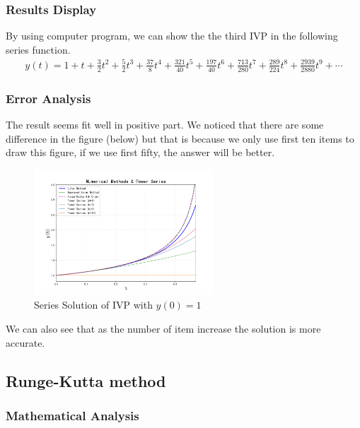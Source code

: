 \documentclass{article}
\begin{document}
\subsubsection{Results Display}

By using computer program, we can show the the third IVP in the following series function.
\begin{align*}
    y(t) = 1 + t + \frac{3}{2} t^2 + \frac{5}{2}t^3 + \frac{37}{8} t^4 + \frac{321}{40}t^5 + \frac{197}{40} t^6 + \frac{713}{280} t^7 + \frac{289}{224} t^8 + \frac{2939}{2880}t^9 + \cdots
\end{align*}

\subsubsection{Error Analysis}
The result seems fit well in positive part. We noticed that there are some difference in the figure (below) but that is because we only use first ten items to draw this figure, if we use first fifty, the answer will be better.
    
    \begin{figure}[htbp]
    \centering
        \centering
        \includegraphics[width=0.6\textwidth]{pic/series.png }
        \caption{Series Solution of IVP with $y(0)=1$}
        \label{fig:Picard_-1}
    \end{figure}

We can also see that as the number of item increase the solution is more accurate.
\subsection{Runge-Kutta method}




\subsubsection{Mathematical Analysis}
\end{document}
